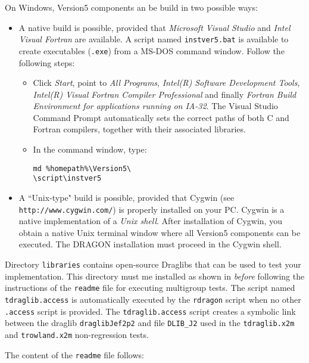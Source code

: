 On Windows, Version5 components an be build in two possible ways:
\begin{itemize}
\item  A native build is possible, provided that {\sl Microsoft Visual Studio} and {\sl Intel Visual Fortran} are available.
A script named {\tt instver5.bat} is available to create executables ({\tt .exe}) from a MS-DOS command
window. Follow the following steps:
\begin{itemize}
\item Click {\sl Start}, point to {\sl All Programs}, {\sl Intel(R) Software Development Tools}, {\sl Intel(R) Visual Fortran
Compiler Professional} and finally {\sl Fortran Build Environment for applications running on IA-32}. The Visual Studio Command Prompt
automatically sets the correct paths of both C and Fortran compilers, together with their associated libraries.
\item In the command window, type: \\
\noindent \begin{verbatim}
md %homepath%\Version5\
\script\instver5
\end{verbatim}
\end{itemize}
\item  A ``Unix-type" build is possible, provided that Cygwin (see {\tt http://www.cygwin.com/}) is properly installed on your PC. Cygwin is a
native implementation of a {\sl Unix shell}. After installation of
Cygwin, you obtain a native Unix
terminal window where all Version5 components can be executed. The DRAGON installation must proceed
in the Cygwin shell.
\end{itemize}

\vskip 0.08cm

Directory {\tt libraries} contains open-source Draglibs that can be used to
test your implementation. This directory must me installed as shown in 
{\sl before} following the instructions of the {\tt readme} file for executing
multigroup tests. The script named
{\tt tdraglib.access} is automatically executed by the {\tt rdragon} script when
no other {\tt *.access} script is provided. The {\tt tdraglib.access} script creates
a symbolic link between the draglib {\tt draglibJef2p2} and file {\tt DLIB\_J2}
used in the {\tt tdraglib.x2m} and {\tt trowland.x2m} non-regression tests.

\vskip 0.08cm

The content of the {\tt readme} file follows:

